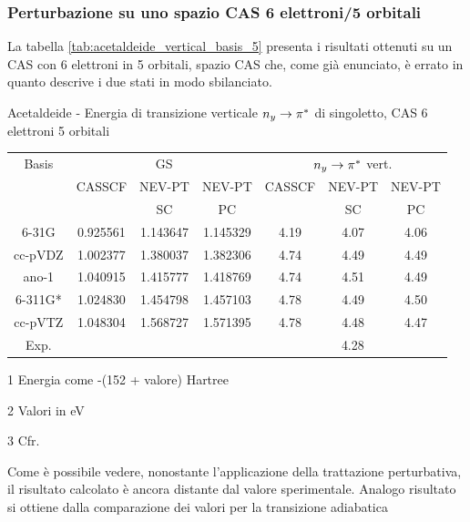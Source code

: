 \subsubsection{Perturbazione su uno spazio CAS 6 elettroni/5 orbitali}

La tabella \ref{tab:acetaldeide_vertical_basis_5} presenta i risultati
ottenuti su un CAS con 6 elettroni in 5 orbitali, spazio CAS che, come gi\`a
enunciato, \`e errato in quanto descrive i due stati in modo sbilanciato.

\begin{center}
\begin{threeparttable}
\caption{\small Acetaldeide - Energia di transizione verticale {$n_y \rightarrow \pi^{*}$} di singoletto, CAS 6 elettroni 5 orbitali}
\label{tab:acetaldeide_vertical_basis_5}
\small
\begin{tabular}{|c|ccc|ccc|}
\hline
Basis	& \multicolumn{3}{c|}{GS\tnote{1}}				& \multicolumn{3}{c|}{$n_y \rightarrow \pi^{*}$ vert.\tnote{2}} \\
		& CASSCF		& NEV-PT	 	&	NEV-PT		& CASSCF		& NEV-PT	& NEV-PT  \\
		& 				& SC 			&	PC			& 				& SC		& PC 	 \\
\hline
6-31G	& 0.925561		& 1.143647		&	1.145329	& 4.19			& 4.07 		& 4.06	\\
cc-pVDZ	& 1.002377	 	& 1.380037		&	1.382306	& 4.74			& 4.49 		& 4.49	\\
ano-1	& 1.040915	 	& 1.415777		&	1.418769	& 4.74			& 4.51 		& 4.49	\\
6-311G*	& 1.024830	 	& 1.454798		&	1.457103	& 4.78			& 4.49 		& 4.50	\\
cc-pVTZ & 1.048304	 	& 1.568727		&	1.571395	& 4.78			& 4.48 		& 4.47	\\			
\hline
\hline
Exp.\tnote{3}&				& 				& 				& \multicolumn{3}{c|}{4.28} \\
\hline
\end{tabular}
\begin{tablenotes}
 \item[1] Energia come -(152 + valore) Hartree
 \item[2] Valori in eV
 \item[3] Cfr. \cite{jpc-97-17-1993-4293}
\end{tablenotes}
\end{threeparttable}
\end{center}

Come \`e possibile vedere, nonostante l'applicazione della trattazione
perturbativa, il risultato calcolato \`e ancora distante dal valore
sperimentale. Analogo risultato si ottiene dalla comparazione dei
valori per la transizione adiabatica

